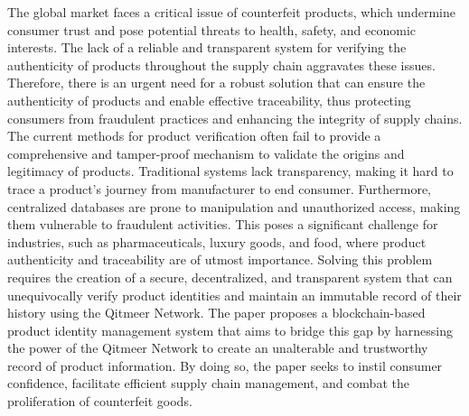 \documentclass[12pt,a4letter]{article}
\begin{document}
The global market faces a critical issue of counterfeit products, which undermine consumer trust and pose potential threats to health, safety, and economic interests. The lack of a reliable and transparent system for verifying the authenticity of products throughout the supply chain aggravates these issues. Therefore, there is an urgent need for a robust solution that can ensure the authenticity of products and enable effective traceability, thus protecting consumers from fraudulent practices and enhancing the integrity of supply chains. The current methods for product verification often fail to provide a comprehensive and tamper-proof mechanism to validate the origins and legitimacy of products. Traditional systems lack transparency, making it hard to trace a product’s journey from manufacturer to end consumer. Furthermore, centralized databases are prone to manipulation and unauthorized access, making them vulnerable to fraudulent activities. This poses a significant challenge for industries, such as pharmaceuticals, luxury goods, and food, where product authenticity and traceability are of utmost importance. Solving this problem requires the creation of a secure, decentralized, and transparent system that can unequivocally verify product identities and maintain an immutable record of their history using the Qitmeer Network. The paper proposes a blockchain-based product identity management system that aims to bridge this gap by harnessing the power of the Qitmeer Network to create an unalterable and trustworthy record of product information. By doing so, the paper seeks to instil consumer confidence, facilitate efficient supply chain management, and combat the proliferation of counterfeit goods.
\end{document}
